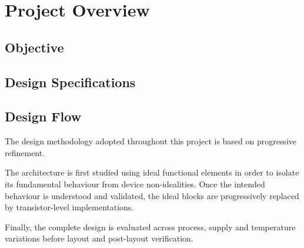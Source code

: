 
\section{Project Overview}
\label{sec:project_overview}

\subsection{Objective}


\begin{designobjective}


\end{designobjective}


\subsection{Design Specifications}



\subsection{Design Flow}

The design methodology adopted throughout this project is based on
progressive refinement.

The architecture is first studied using ideal functional elements in
order to isolate its fundamental behaviour from device non-idealities.
Once the intended behaviour is understood and validated, the ideal
blocks are progressively replaced by transistor-level implementations.

Finally, the complete design is evaluated across process, supply and
temperature variations before layout and post-layout verification.
